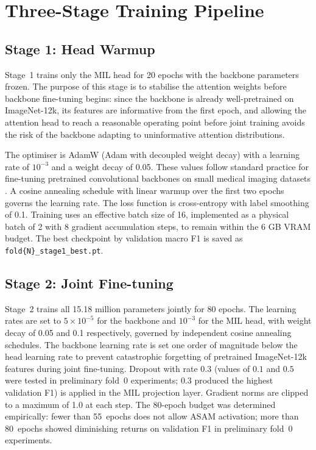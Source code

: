 \section{Three-Stage Training Pipeline}
\label{sec:training-strategy}


\subsection{Stage 1: Head Warmup}
\label{sec:stage1}

Stage~1 trains only the MIL head for 20 epochs with the
backbone parameters frozen.
The purpose of this stage is to stabilise the attention
weights before backbone fine-tuning begins: since the
backbone is already well-pretrained on ImageNet-12k, its
features are informative from the first epoch, and allowing
the attention head to reach a reasonable operating point
before joint training avoids the risk of the backbone
adapting to uninformative attention distributions.

The optimiser is AdamW \cite{loshchilov2019adamw} (Adam with
decoupled weight decay) with a learning rate of $10^{-3}$
and a weight decay of 0.05.
These values follow standard practice for fine-tuning
pretrained convolutional backbones on small medical imaging
datasets \cite{guan2024federated}.
A cosine annealing schedule with linear warmup over the
first two epochs governs the learning rate.
The loss function is cross-entropy with label smoothing
of 0.1.
Training uses an effective batch size of 16, implemented
as a physical batch of 2 with 8 gradient accumulation
steps, to remain within the 6 GB VRAM budget.
The best checkpoint by validation macro F1 is saved as
\texttt{fold\{N\}\_stage1\_best.pt}.


\subsection{Stage 2: Joint Fine-tuning}
\label{sec:stage2}

Stage~2 trains all 15.18 million parameters jointly for
80 epochs.
The learning rates are set to $5 \times 10^{-5}$ for the
backbone and $10^{-3}$ for the MIL head, with weight decay
of 0.05 and 0.1 respectively, governed by independent
cosine annealing schedules.
The backbone learning rate is set one order of magnitude
below the head learning rate to prevent catastrophic
forgetting of pretrained ImageNet-12k features during
joint fine-tuning.
Dropout with rate $0.3$ (values of $0.1$ and $0.5$ were
tested in preliminary fold~0 experiments; $0.3$ produced
the highest validation F1) is applied in the MIL projection
layer.
Gradient norms are clipped to a maximum of 1.0 at each step.
The 80-epoch budget was determined empirically:
fewer than 55~epochs does not allow \textsc{ASAM}
activation; more than 80~epochs showed diminishing
returns on validation F1 in preliminary fold~0 experiments.

